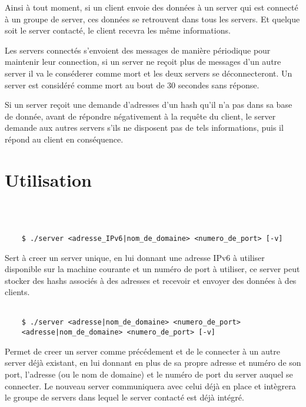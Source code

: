 \documentclass[a4paper,11pt,DIV=12]{scrreprt}
\begin{document}
    Ainsi à tout moment, si un client envoie des données à un server qui est
    connecté à un groupe de server, ces données se retrouvent dans tous les
    servers. Et quelque soit le server contacté, le client recevra les même
    informations.

    Les servers connectés s'envoient des messages de manière périodique pour
    maintenir leur connection, si un server ne reçoit plus de messages d'un
    autre server il va le conséderer comme mort et les deux servers se
    déconnecteront. Un server est considéré comme mort au bout de 30 secondes
    sans réponse.

    Si un server reçoit une demande d'adresses d'un hash qu'il n'a pas
    dans sa base de donnée, avant de répondre négativement à la requête du
    client, le server demande aux autres servers s'ils ne disposent pas de
    tels informations, puis il répond au client en conséquence.

    \chapter{Utilisation}

    \ \\ \\

    \begin{lstlisting}
    $ ./server <adresse_IPv6|nom_de_domaine> <numero_de_port> [-v]
    \end{lstlisting}

    Sert à creer un server unique, en lui donnant une adresse IPv6 à utiliser
    disponible sur la machine courante et un numéro de port à utiliser,
    ce server peut stocker des hashs associés à des adresses et recevoir et
    envoyer des données à des clients.
    \\ \\

    \begin{lstlisting}
    $ ./server <adresse|nom_de_domaine> <numero_de_port>
    <adresse|nom_de_domaine> <numero_de_port> [-v]
    \end{lstlisting}

    Permet de creer un server comme précédement et de le connecter à un autre
    server déjà existant, en lui donnant en plus de sa propre adresse et
    numéro de son port, l'adresse (ou le nom de domaine) et
    le numéro de port du server auquel se connecter. Le nouveau server
    communiquera avec celui déjà en place et intègrera le groupe de servers
    dans lequel le server contacté est déjà intégré.
    \\ \\
\end{document}
